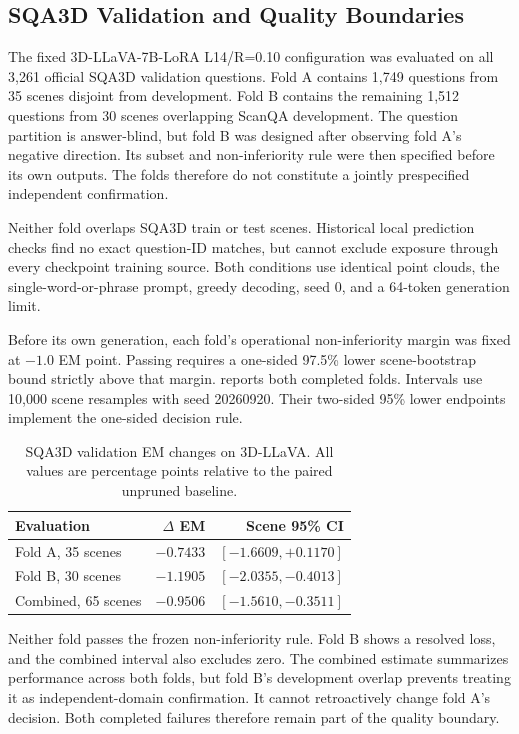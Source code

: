 \subsection{SQA3D Validation and Quality Boundaries}
\label{sec:supp_sqa_validation}
The fixed 3D-LLaVA-7B-LoRA L14/R=0.10 configuration was evaluated on all 3,261 official SQA3D validation questions. Fold A contains 1,749 questions from 35 scenes disjoint from development. Fold B contains the remaining 1,512 questions from 30 scenes overlapping ScanQA development. The question partition is answer-blind, but fold B was designed after observing fold A's negative direction. Its subset and non-inferiority rule were then specified before its own outputs. The folds therefore do not constitute a jointly prespecified independent confirmation.

Neither fold overlaps SQA3D train or test scenes. Historical local prediction checks find no exact question-ID matches, but cannot exclude exposure through every checkpoint training source. Both conditions use identical point clouds, the single-word-or-phrase prompt, greedy decoding, seed 0, and a 64-token generation limit.

Before its own generation, each fold's operational non-inferiority margin was fixed at $-1.0$ EM point. Passing requires a one-sided 97.5\% lower scene-bootstrap bound strictly above that margin.  reports both completed folds. Intervals use 10,000 scene resamples with seed 20260920. Their two-sided 95\% lower endpoints implement the one-sided decision rule.

\begin{table}[t]
\centering
\caption{SQA3D validation EM changes on 3D-LLaVA. All values are percentage points relative to the paired unpruned baseline.}
\label{tab:sqa_validation}
\small
\begin{tabular}{lrr}
\toprule
Evaluation & $\Delta$ EM & Scene 95\% CI \\
\midrule
Fold A, 35 scenes & $-0.7433$ & $[-1.6609,+0.1170]$ \\
Fold B, 30 scenes & $-1.1905$ & $[-2.0355,-0.4013]$ \\
Combined, 65 scenes & $-0.9506$ & $[-1.5610,-0.3511]$ \\
\bottomrule
\end{tabular}
\end{table}

Neither fold passes the frozen non-inferiority rule. Fold B shows a resolved loss, and the combined interval also excludes zero. The combined estimate summarizes performance across both folds, but fold B's development overlap prevents treating it as independent-domain confirmation. It cannot retroactively change fold A's decision. Both completed failures therefore remain part of the quality boundary.

